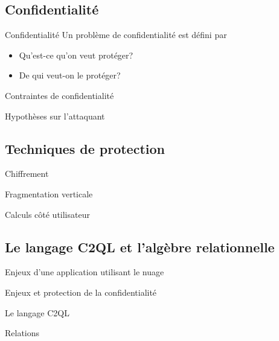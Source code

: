 \documentclass{beamer}
\begin{document}
\subsection{Confidentialité}
\begin{frame}{Confidentialité}
Un problème de confidentialité est défini par
\begin{itemize}
\item Qu'est-ce qu'on veut protéger?
\item De qui veut-on le protéger?
\end{itemize}
\end{frame}

\begin{frame}{Contraintes de confidentialité}
\end{frame}

\begin{frame}{Hypothèses sur l'attaquant}
\end{frame}

\subsection{Techniques de protection}
\begin{frame}{Chiffrement}
\end{frame}

\begin{frame}{Fragmentation verticale}
\end{frame}

\begin{frame}{Calculs côté utilisateur}
\end{frame}

\subsection{Le langage C2QL et l'algèbre relationnelle}
\begin{frame}{Enjeux d'une application utilisant le nuage}
\end{frame}

\begin{frame}{Enjeux et protection de la confidentialité}
\end{frame}

\begin{frame}{Le langage C2QL}
\end{frame}

\begin{frame}{Relations}
\end{frame}
\end{document}
